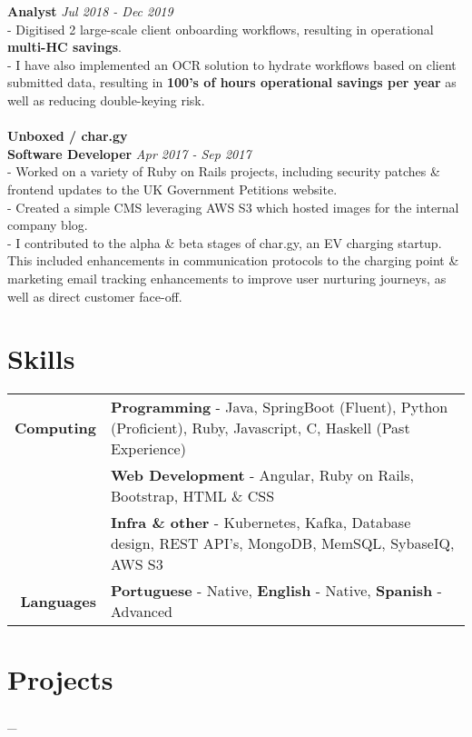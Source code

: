 \documentclass[a4paper,10pt]{article}
\begin{document}
		\textbf{Analyst}  \hfill \textit{Jul 2018 - Dec 2019}
		\\ - Digitised 2 large-scale client onboarding workflows, resulting in operational \textbf{multi-HC savings}. 
		\\ - I have also implemented an OCR solution to hydrate workflows based on client submitted data, resulting in \textbf{100's of hours operational savings per year} as well as reducing double-keying risk.
		\\\\\hfill\textbf{Unboxed / char.gy} 
		\\\textbf{Software Developer} \hfill \textit{Apr 2017 - Sep 2017 }
		\\ - Worked on a variety of Ruby on Rails projects, including security patches \& frontend updates to the UK Government Petitions website. 
		\\ - Created a simple CMS leveraging AWS S3 which hosted images for the internal company blog. 
		\\ - I contributed to the alpha \& beta stages of char.gy, an EV charging startup. This included enhancements in communication protocols to the charging point \& marketing email tracking enhancements to improve user nurturing journeys, as well as direct customer face-off.
	
		

	

	
		\section*{Skills}
	
	\begin{tabular}{r|p{12cm}}	
		\textbf{Computing}	 & \textbf{Programming} - Java, SpringBoot (Fluent), Python (Proficient), Ruby, Javascript, C, Haskell (Past Experience) \\&
								\textbf{Web Development} - Angular, Ruby on Rails, Bootstrap, HTML \& CSS \\&
								\textbf{Infra \& other} - Kubernetes, Kafka, Database design, REST API's, MongoDB, MemSQL, SybaseIQ, AWS S3  \\
		\textbf{Languages}   & \textbf{Portuguese} - Native, \textbf{English} - Native, \textbf{Spanish} - Advanced
	\end{tabular}
	
	\section*{Projects}_
	
\end{document}
